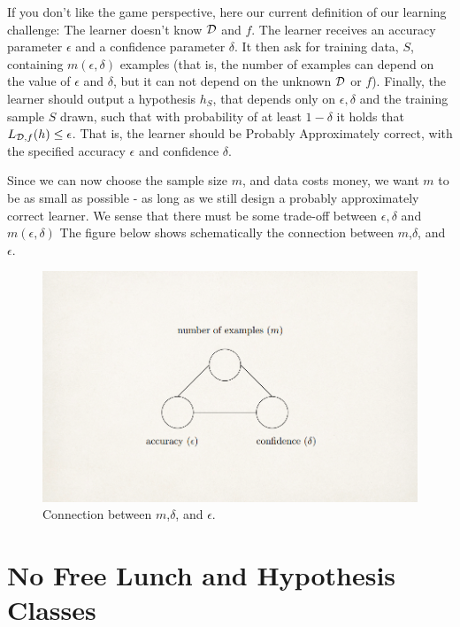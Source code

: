 {If you don't like the game perspective, here our current definition of our learning challenge:
The learner doesn't know $\mathcal{D}$ and $f$. The learner receives an accuracy parameter $\epsilon$ and a confidence parameter $\delta$. It then ask for training data, $S$, containing $m(\epsilon,\delta)$ examples (that is, the number of examples can depend on the value of $\epsilon$ and $\delta$, but it can not depend on the unknown $\mathcal{D}$ or $f$). Finally, the learner should output a hypothesis $h_S$, that depends only on $\epsilon, \delta$ and the training sample $S$ drawn, such that with probability of at least $1-\delta$  it holds that $L_{\mathcal{D},f}(h) \le \epsilon$. That is, the learner should be Probably Approximately correct, with the specified accuracy $\epsilon$ and confidence $\delta$.

\vspace{3mm}
Since we can now choose the sample size $m$, and data costs money, we want $m$ to be as small as possible - as long as we still design a probably approximately correct learner. We sense that there must be some trade-off between $\epsilon,\delta$ and $m(\epsilon,\delta)$
The figure below shows schematically the connection between $m$,$\delta$, and $\epsilon$.

\begin{figure}[h!]
	\centering
	\includegraphics[scale=0.3]{chapters/pac/figures/m_eps_del.png}
	\caption{Connection between $m$,$\delta$, and $\epsilon$.}
\end{figure}


\section{No Free Lunch and Hypothesis Classes}


}

